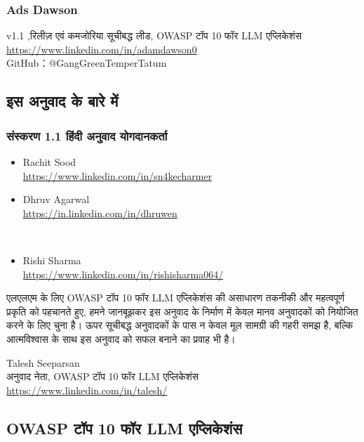 \documentclass[
]{article}
\providecommand{\tightlist}{%
  \setlength{\itemsep}{0pt}\setlength{\parskip}{0pt}}
\begin{document}
\subsubsection{Ads Dawson}\label{ads-dawson}

v1.1 ,रिलीज़ एवं कमजोरिया सूचीबद्ध लीड, OWASP टॉप 10 फॉर LLM एप्लिकेशंस\\
\href{https://www.linkedin.com/in/adamdawson0/}{https://www.linkedin.com/in/adamdawson0}\\
GitHub：@GangGreenTemperTatum

\subsection{इस अनुवाद के बारे
में}\label{ux907ux938-ux905ux928ux935ux926-ux915-ux92cux930-ux92e}

\subsubsection{संस्करण 1.1 हिंदी अनुवाद
योगदानकर्ता}\label{ux938ux938ux915ux930ux923-1.1-ux939ux926-ux905ux928ux935ux926-ux92fux917ux926ux928ux915ux930ux924}

\begin{itemize}
\tightlist
\item
  Rachit Sood\\
  \href{https://www.linkedin.com/in/sn4kecharmer/}{https://www.linkedin.com/in/sn4kecharmer}\\
\item
  Dhruv Agarwal\\
  \url{https://in.linkedin.com/in/dhruwen}\strut \\
\item
  Rishi Sharma\\
  \url{https://www.linkedin.com/in/rishisharma064/}
\end{itemize}

एलएलएम के लिए OWASP टॉप 10 फॉर LLM एप्लिकेशंस की असाधारण तकनीकी और महत्वपूर्ण
प्रकृति को पहचानते हुए, हमने जानबूझकर इस अनुवाद के निर्माण में केवल मानव अनुवादकों को
नियोजित करने के लिए चुना है। ऊपर सूचीबद्ध अनुवादकों के पास न केवल मूल सामग्री की
गहरी समझ है, बल्कि आत्मविश्वास के साथ इस अनुवाद को सफल बनाने का प्रवाह भी है।

Talesh Seeparsan\\
अनुवाद नेता, OWASP टॉप 10 फॉर LLM एप्लिकेशंस\\
\url{https://www.linkedin.com/in/talesh/}

\subsection{OWASP टॉप 10 फॉर LLM
एप्लिकेशंस}\label{owasp-ux91fux92a-10-ux92bux930-llm-ux90fux92aux932ux915ux936ux938}
\end{document}
